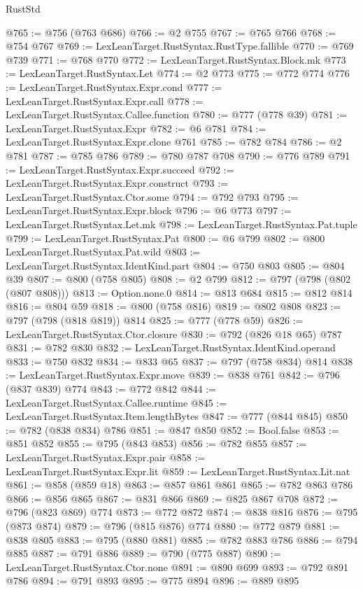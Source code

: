 \begin{lexlean}{RustStd}
\begin{coremodule}
{\begin{coremodule}
{{{{{{{{{{{{{{@765 := @756 (@763 @686)
@766 := @2 @755
@767 := @765 @766
@768 := @754 @767
@769 := LexLeanTarget.RustSyntax.RustType.fallible
@770 := @769 @739
@771 := @768 @770
@772 := LexLeanTarget.RustSyntax.Block.mk
@773 := LexLeanTarget.RustSyntax.Let
@774 := @2 @773
@775 := @772 @774
@776 := LexLeanTarget.RustSyntax.Expr.cond
@777 := LexLeanTarget.RustSyntax.Expr.call
@778 := LexLeanTarget.RustSyntax.Callee.function
@780 := @777 (@778 @39)
@781 := LexLeanTarget.RustSyntax.Expr
@782 := @6 @781
@784 := LexLeanTarget.RustSyntax.Expr.clone @761
@785 := @782 @784
@786 := @2 @781
@787 := @785 @786
@789 := @780 @787 @708
@790 := @776 @789
@791 := LexLeanTarget.RustSyntax.Expr.succeed
@792 := LexLeanTarget.RustSyntax.Expr.construct
@793 := LexLeanTarget.RustSyntax.Ctor.some
@794 := @792 @793
@795 := LexLeanTarget.RustSyntax.Expr.block
@796 := @6 @773
@797 := LexLeanTarget.RustSyntax.Let.mk
@798 := LexLeanTarget.RustSyntax.Pat.tuple
@799 := LexLeanTarget.RustSyntax.Pat
@800 := @6 @799
@802 := @800 LexLeanTarget.RustSyntax.Pat.wild
@803 := LexLeanTarget.RustSyntax.IdentKind.part
@804 := @750 @803
@805 := @804 @39
@807 := @800 (@758 @805)
@808 := @2 @799
@812 := @797 (@798 (@802 (@807 @808)))
@813 := Option.none.{0}
@814 := @813 @684
@815 := @812 @814
@816 := @804 @59
@818 := @800 (@758 @816)
@819 := @802 @808
@823 := @797 (@798 (@818 @819)) @814
@825 := @777 (@778 @59)
@826 := LexLeanTarget.RustSyntax.Ctor.closure
@830 := @792 (@826 @18 @65) @787
@831 := @782 @830
@832 := LexLeanTarget.RustSyntax.IdentKind.operand
@833 := @750 @832
@834 := @833 @65
@837 := @797 (@758 @834) @814
@838 := LexLeanTarget.RustSyntax.Expr.move
@839 := @838 @761
@842 := @796 (@837 @839) @774
@843 := @772 @842
@844 := LexLeanTarget.RustSyntax.Callee.runtime
@845 := LexLeanTarget.RustSyntax.Item.lengthBytes
@847 := @777 (@844 @845)
@850 := @782 (@838 @834) @786
@851 := @847 @850
@852 := Bool.false
@853 := @851 @852
@855 := @795 (@843 @853)
@856 := @782 @855
@857 := LexLeanTarget.RustSyntax.Expr.pair
@858 := LexLeanTarget.RustSyntax.Expr.lit
@859 := LexLeanTarget.RustSyntax.Lit.nat
@861 := @858 (@859 @18)
@863 := @857 @861 @861
@865 := @782 @863 @786
@866 := @856 @865
@867 := @831 @866
@869 := @825 @867 @708
@872 := @796 (@823 @869) @774
@873 := @772 @872
@874 := @838 @816
@876 := @795 (@873 @874)
@879 := @796 (@815 @876) @774
@880 := @772 @879
@881 := @838 @805
@883 := @795 (@880 @881)
@885 := @782 @883 @786
@886 := @794 @885
@887 := @791 @886
@889 := @790 (@775 @887)
@890 := LexLeanTarget.RustSyntax.Ctor.none
@891 := @890 @699
@893 := @792 @891 @786
@894 := @791 @893
@895 := @775 @894
@896 := @889 @895
}}}}}}}}}}}}}}
\end{coremodule}}
\end{coremodule}
\end{lexlean}
